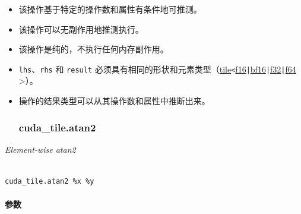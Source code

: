 \documentclass{article}
\begin{document}
\begin{itemize}
\item 该操作基于特定的操作数和属性有条件地可推测。
\item 该操作可以无副作用地推测执行。
\item 该操作是纯的，不执行任何内存副作用。
\item \texttt{lhs}、\texttt{rhs} 和 \texttt{result} 必须具有相同的形状和元素类型（\href{https://docs.nvidia.com/cuda/tile-ir/latest/sections/types.html#type-tile}{tile}\texttt{<}\href{https://docs.nvidia.com/cuda/tile-ir/latest/sections/types.html#subsection-element-types}{f16}\texttt{|}\href{https://docs.nvidia.com/cuda/tile-ir/latest/sections/types.html#subsection-element-types}{bf16}\texttt{|}\href{https://docs.nvidia.com/cuda/tile-ir/latest/sections/types.html#subsection-element-types}{f32}\texttt{|}\href{https://docs.nvidia.com/cuda/tile-ir/latest/sections/types.html#subsection-element-types}{f64} >）。
\item 操作的结果类型可以从其操作数和属性中推断出来。




\subsubsection{cuda\_tile.atan2}


\end{itemize}
\textit{Element-wise atan2}




\begin{lstlisting}

cuda_tile.atan2 %x %y

\end{lstlisting}



\paragraph{参数}
\end{document}
